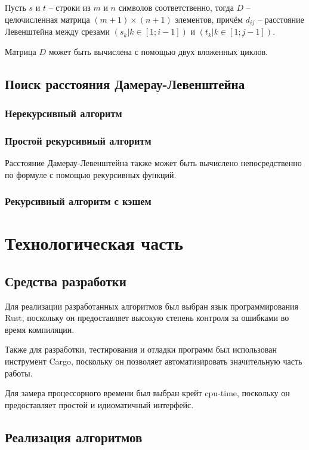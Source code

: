 \documentclass[oneside, a4paper, 12pt]{article}
\begin{document}
Пусть $s$ и $t$ -- строки из $m$ и $n$ символов соответственно,
тогда $D$ -- целочисленная матрица $(m + 1) \times (n + 1)$
элементов, причём $d_{ij}$ -- расстояние Левенштейна между срезами
$(s_k | k \in [1; i - 1])$ и $(t_k | k \in [1; j - 1])$.

Матрица $D$ может быть вычислена с помощью двух вложенных циклов.

\subsection{Поиск расстояния Дамерау-Левенштейна}

\subsubsection{Нерекурсивный алгоритм}

\subsubsection{Простой рекурсивный алгоритм}

Расстояние Дамерау-Левенштейна также может быть вычислено
непосредственно по формуле с помощью рекурсивных функций.

\subsubsection{Рекурсивный алгоритм с кэшем}

\section{Технологическая часть}

\subsection{Средства разработки}

Для реализации разработанных алгоритмов был выбран язык
программирования Rust, поскольку он предоставляет высокую степень
контроля за ошибками во время компиляции.

Также для разработки, тестирования и отладки программ был
использован инструмент Cargo, поскольку он позволяет
автоматизировать значительную часть работы.

Для замера процессорного времени был выбран крейт cpu-time,
поскольку он предоставляет простой и идиоматичный интерфейс.

\subsection{Реализация алгоритмов}
\end{document}
